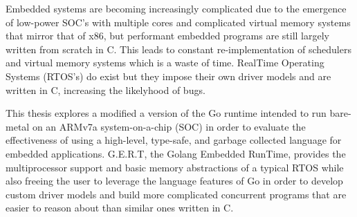 % 
% 
%

Embedded systems are becoming increasingly complicated due
to the emergence of low-power SOC's with multiple cores and
complicated virtual memory systems that mirror that of x86,
but performant embedded programs are still largely written from scratch in
C. This leads to constant re-implementation of schedulers and virtual memory systems
which is a waste of time. RealTime Operating Systems (RTOS's) do exist
but they impose their own driver models and are written in C, increasing the likelyhood
of bugs.\par
  This thesis explores a modified a version of the Go runtime intended to run
bare-metal on an ARMv7a system-on-a-chip (SOC) in order to evaluate
the effectiveness of using a high-level, type-safe, and garbage collected
language for embedded applications. G.E.R.T, the Golang Embedded RunTime,
provides the multiprocessor support and basic memory abstractions of a
typical RTOS while also freeing the user to leverage the language features
of Go in order to develop custom driver models and build more complicated
concurrent programs that are easier to reason about than similar ones
written in C.

